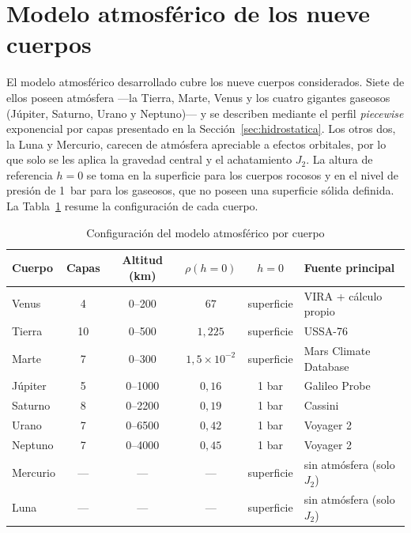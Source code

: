 \section{Modelo atmosférico de los nueve cuerpos}
\label{sec:res-atmosfera}

El modelo atmosférico desarrollado cubre los nueve cuerpos considerados. Siete de ellos poseen atmósfera ---la Tierra, Marte, Venus y los cuatro gigantes gaseosos (Júpiter, Saturno, Urano y Neptuno)--- y se describen mediante el perfil \textit{piecewise} exponencial por capas presentado en la Sección~\ref{sec:hidrostatica}. Los otros dos, la Luna y Mercurio, carecen de atmósfera apreciable a efectos orbitales, por lo que solo se les aplica la gravedad central y el achatamiento $J_2$. La altura de referencia $h=0$ se toma en la superficie para los cuerpos rocosos y en el nivel de presión de 1~bar para los gaseosos, que no poseen una superficie sólida definida. La Tabla~\ref{tab:res-atmosfera} resume la configuración de cada cuerpo.

\begin{table}[htbp]
  \centering
  \caption{Configuración del modelo atmosférico por cuerpo}
  \label{tab:res-atmosfera}
  \begin{tabularx}{\textwidth}{l c c c c X}
    \hline
    \textbf{Cuerpo} & \textbf{Capas} & \textbf{Altitud (km)} & \textbf{$\rho(h{=}0)$} & \textbf{$h=0$} & \textbf{Fuente principal} \\
    \hline
    Venus    & 4  & 0--200  & $67$                 & superficie & \gls{VIRA} + cálculo propio \\
    Tierra   & 10 & 0--500  & $1{,}225$            & superficie & \gls{USSA}-76 \\
    Marte    & 7  & 0--300  & $1{,}5\times10^{-2}$ & superficie & Mars Climate Database \\
    Júpiter  & 5  & 0--1000 & $0{,}16$             & 1 bar      & Galileo Probe \\
    Saturno  & 8  & 0--2200 & $0{,}19$             & 1 bar      & Cassini \\
    Urano    & 7  & 0--6500 & $0{,}42$             & 1 bar      & Voyager 2 \\
    Neptuno  & 7  & 0--4000 & $0{,}45$             & 1 bar      & Voyager 2 \\
    \hline
    Mercurio & --- & --- & --- & superficie & sin atmósfera (solo $J_2$) \\
    Luna     & --- & --- & --- & superficie & sin atmósfera (solo $J_2$) \\
    \hline
  \end{tabularx}
\end{table}

